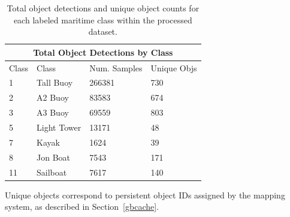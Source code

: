 \documentclass[../main.tex]{subfiles}
\begin{document}
\begin{table}[ht]
\centering
\begin{tabular}{llll}
\hline
\multicolumn{4}{c}{Total Object Detections by Class}\\
\hline
\hline
Class & Class       & Num. Samples & Unique Objs \\
1     & Tall Buoy   & 266381       & 730         \\
2     & A2 Buoy     & 83583        & 674         \\
3     & A3 Buoy     & 69559        & 803         \\
5     & Light Tower & 13171        & 48          \\
7     & Kayak       & 1624         & 39          \\
8     & Jon Boat    & 7543         & 171         \\
11    & Sailboat    & 7617         & 140  \\      
\hline
\end{tabular}
\caption{Total object detections and unique object counts for each labeled maritime class within the processed dataset.}
\label{tab:obj_class_dets}
\end{table}

Unique objects correspond to persistent object IDs assigned by the mapping system, as described in Section~\ref{gbcache}.
\end{document}
